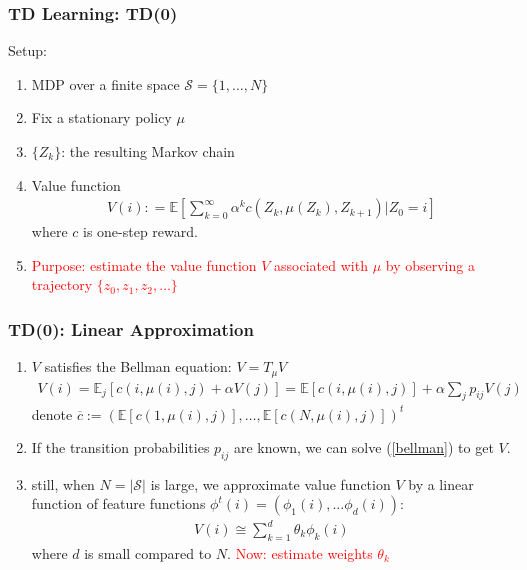 \documentclass[t,10pt]{beamer}
\newcommand{\E}{\mathbb{E}}
\theoremstyle{remark}
\newcommand{\red}[1]{\textcolor{red}{#1}}
\begin{document}



\begin{frame}

\frametitle{TD Learning: TD(0)}
Setup:
\begin{enumerate}
\item MDP over a finite space $\mathcal{S} = \{1, \ldots, N\}$
\item Fix a stationary policy $\mu$
\item $\{Z_k\}$: the resulting Markov chain
\item Value function 
\begin{align}
V(i): = \E\left[ \sum_{k=0}^\infty \alpha^k c(Z_k, \mu(Z_k), Z_{k+1}) \bigg| Z_0 = i \right]
\end{align}
where $c$ is one-step reward. 
\item \red{Purpose: estimate the value function $V$ associated with $\mu$ by observing a trajectory $\{z_0, z_1, z_2, \ldots\}$}

\end{enumerate}
\end{frame}






\begin{frame}

\frametitle{TD(0): Linear Approximation}
\begin{enumerate}
\item $V$ satisfies the Bellman equation: $V = T_\mu V$
\begin{align} \label{bellman}
V(i) = \E_j[c(i, \mu(i), j) + \alpha V(j)] = \E[c(i, \mu(i), j)] + \alpha \sum_j p_{ij} V(j)
\end{align}
denote $\overline{c}:=  (\E[c(1, \mu(i), j)], \ldots, \E[c(N, \mu(i), j)])^t$
\item If the transition probabilities $p_{ij}$ are known, we can solve (\ref{bellman}) to get $V$. 
\item still, when $N=|\mathcal{S}|$ is large, we approximate value function $V$ by a linear function of feature functions $\phi^t(i) = (\phi_1(i), \ldots \phi_d(i))$:
\begin{align}
V(i) \cong \sum_{k=1}^d \theta_k\phi_k(i) 
\end{align}
where $d$ is small compared to $N$. \red{Now: estimate weights $\theta_k$}
\end{enumerate}
\end{frame}
\end{document}
